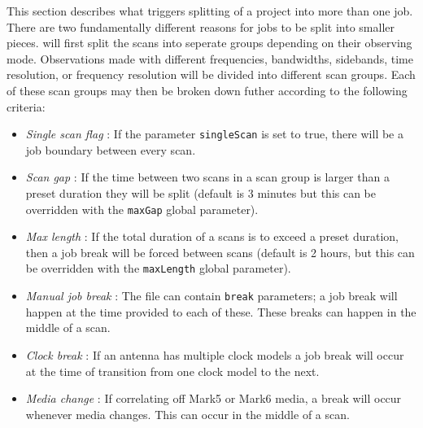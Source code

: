\documentclass[12pt]{article}
\begin{document}
This section describes what triggers splitting of a project into more than one job.
There are two fundamentally different reasons for jobs to be split into smaller pieces.
\vexdifx will first split the scans into seperate groups depending on their observing mode.
Observations made with different frequencies, bandwidths, sidebands, time resolution, or frequency resolution will be divided into different scan groups.
Each of these scan groups may then be broken down futher according to the following criteria:
\begin{itemize}
\item {\em Single scan flag} : If the parameter {\tt singleScan} is set to true, there will be a job boundary between every scan.
\item {\em Scan gap} : If the time between two scans in a scan group is larger than a preset duration they will be split (default is 3 minutes but this can be overridden with the {\tt maxGap} global parameter).
\item {\em Max length} : If the total duration of a scans is to exceed a preset duration, then a job break will be forced between scans (default is 2 hours, but this can be overridden with the {\tt maxLength} global parameter).
\item {\em Manual job break} : The \vd file can contain {\tt break} parameters; a job break will happen at the time provided to each of these.  These breaks can happen in the middle of a scan.
\item {\em Clock break} : If an antenna has multiple clock models a job break will occur at the time of transition from one clock model to the next.
\item {\em Media change} : If correlating off Mark5 or Mark6 media, a break will occur whenever media changes.  This can occur in the middle of a scan.
\end{itemize}
\end{document}
